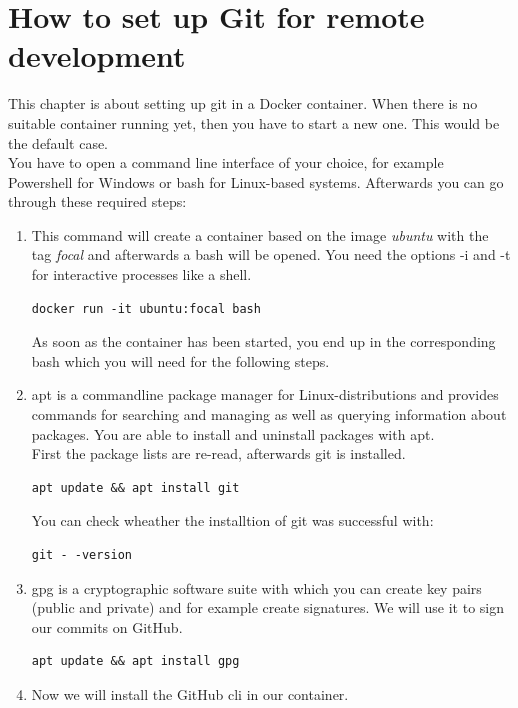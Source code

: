 \section{How to set up Git for remote development}\label{sec:git_remote}
    This chapter is about setting up git in a Docker container. When there is no suitable container running yet, then you have to start a new one. This would be the default case. \\
    You have to open a command line interface of your choice, for example Powershell for Windows or \ac{bash} for Linux-based systems. 
    Afterwards you can go through these required steps: 
    \begin{enumerate}
        \item This command will create a container based on the image \textit{ubuntu} with the tag \textit{focal} and afterwards a \ac{bash} will be opened. You need the options -i and -t for interactive processes like a shell.
            \begin{lstlisting}[style=bash]
docker run -it ubuntu:focal bash 
            \end{lstlisting}
        As soon as the container has been started, you end up in the corresponding \ac{bash} which you will need for the following steps.
        \item \ac{apt} is a commandline package manager for Linux-distributions and provides commands for searching and managing as well as querying information about packages. You are able to install and uninstall packages with \ac{apt}. \\
        First the package lists are re-read, afterwards git is installed. 
            \begin{lstlisting}[style=bash] 
apt update && apt install git
            \end{lstlisting}
            You can check wheather the installtion of git was successful with: 
            \begin{lstlisting}[style=bash]
git - -version
            \end{lstlisting}
        \item \ac{gpg} is a cryptographic software suite with which you can create key pairs (public and private) and for example create signatures. We will use it to sign our commits on GitHub.
            \begin{lstlisting}[style=bash]
apt update && apt install gpg
            \end{lstlisting}
        \item Now we will install the GitHub \ac{cli} in our container. \\

\end{enumerate}
